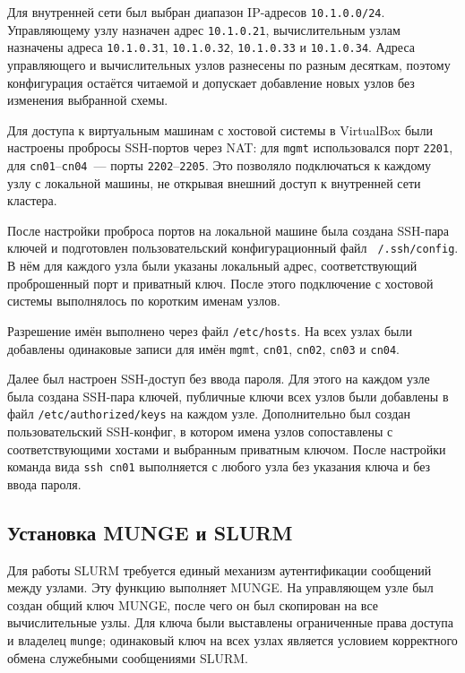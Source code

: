 Для внутренней сети был выбран диапазон IP-адресов \texttt{10.1.0.0/24}. Управляющему узлу назначен адрес \texttt{10.1.0.21}, вычислительным узлам назначены адреса \texttt{10.1.0.31}, \texttt{10.1.0.32}, \texttt{10.1.0.33} и \texttt{10.1.0.34}. Адреса управляющего и вычислительных узлов разнесены по разным десяткам, поэтому конфигурация остаётся читаемой и допускает добавление новых узлов без изменения выбранной схемы.

Для доступа к виртуальным машинам с хостовой системы в VirtualBox были настроены пробросы SSH-портов через NAT: для \texttt{mgmt} использовался порт \texttt{2201}, для \texttt{cn01}--\texttt{cn04}~--- порты \texttt{2202}--\texttt{2205}. Это позволяло подключаться к каждому узлу с локальной машины, не открывая внешний доступ к внутренней сети кластера.

После настройки проброса портов на локальной машине была создана SSH-пара ключей и подготовлен пользовательский конфигурационный файл \texttt{~/.ssh/config}. В нём для каждого узла были указаны локальный адрес, соответствующий проброшенный порт и приватный ключ. После этого подключение с хостовой системы выполнялось по коротким именам узлов.

Разрешение имён выполнено через файл \texttt{/etc/hosts}. На всех узлах были добавлены одинаковые записи для имён \texttt{mgmt}, \texttt{cn01}, \texttt{cn02}, \texttt{cn03} и \texttt{cn04}.

Далее был настроен SSH-доступ без ввода пароля. Для этого на каждом узле была создана SSH-пара ключей, публичные ключи всех узлов были добавлены в файл \texttt{/etc/authorized/keys} на каждом узле. Дополнительно был создан пользовательский SSH-конфиг, в котором имена узлов сопоставлены с соответствующими хостами и выбранным приватным ключом. После настройки команда вида \texttt{ssh cn01} выполняется с любого узла без указания ключа и без ввода пароля.

\subsection{Установка MUNGE и SLURM}

Для работы SLURM требуется единый механизм аутентификации сообщений между узлами. Эту функцию выполняет MUNGE. На управляющем узле был создан общий ключ MUNGE, после чего он был скопирован на все вычислительные узлы. Для ключа были выставлены ограниченные права доступа и владелец \texttt{munge}; одинаковый ключ на всех узлах является условием корректного обмена служебными сообщениями SLURM.

